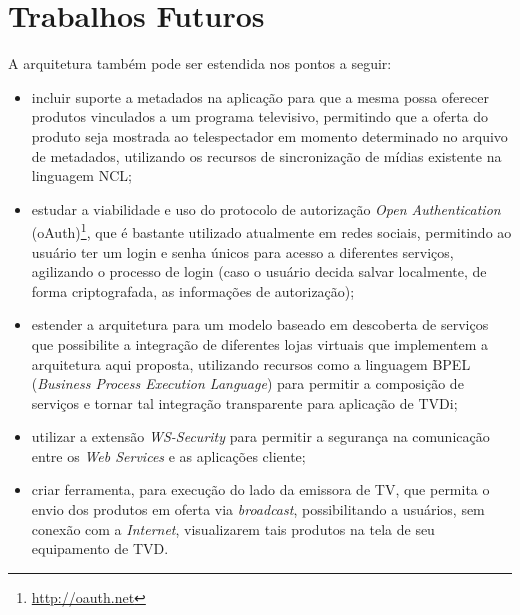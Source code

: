 \section{Trabalhos Futuros}



A arquitetura também pode ser estendida nos pontos a seguir:

\begin{itemize}
	\item incluir suporte a metadados na aplicação para que a
mesma possa oferecer produtos vinculados
a um programa televisivo, permitindo que
a oferta do produto seja mostrada 
ao telespectador em momento determinado no
arquivo de metadados, utilizando os recursos
de sincronização de mídias existente na linguagem NCL;
   \item estudar a viabilidade e uso do protocolo de autorização \textit{Open Authentication} (oAuth)\footnote{\url{http://oauth.net}},
que é bastante utilizado atualmente em redes sociais,
permitindo ao usuário ter um login e senha únicos para acesso a diferentes serviços,
agilizando o processo de login (caso o usuário decida salvar localmente, de forma criptografada, 
as informações de autorização);
   \item estender a arquitetura para um modelo baseado em descoberta de serviços que
possibilite a integração de diferentes lojas virtuais
que implementem a arquitetura aqui proposta,
utilizando recursos como a linguagem BPEL (\textit{Business Process Execution Language})
para permitir a composição de serviços e tornar tal integração transparente para aplicação de TVDi;
  \item utilizar a extensão \textit{WS-Security}\cite{oasis-wssecurity} para permitir a segurança na comunicação entre os \textit{Web Services} e as aplicações cliente;
  \item criar ferramenta, para execução do lado da emissora de TV, que permita o envio dos produtos em oferta
  via \textit{broadcast}, possibilitando a usuários, sem conexão com a \textit{Internet}, visualizarem tais produtos
  na tela de seu equipamento de TVD.
\end{itemize}


